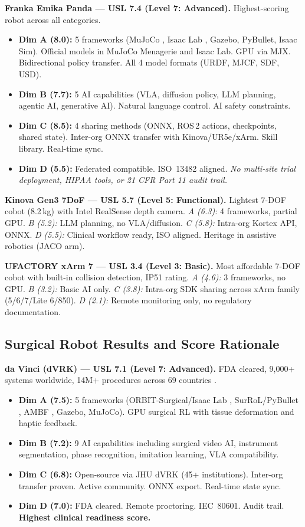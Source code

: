 \documentclass[11pt,a4paper]{article}
\begin{document}
\textbf{Franka Emika Panda --- USL 7.4 (Level 7: Advanced).} Highest-scoring robot across all categories.
\begin{itemize}
  \item \textbf{Dim A (8.0):} 5 frameworks (MuJoCo \cite{mujoco2024}, Isaac Lab \cite{isaaclab2024}, Gazebo, PyBullet, Isaac Sim). Official models in MuJoCo Menagerie \cite{menagerie2024} and Isaac Lab. GPU via MJX. Bidirectional policy transfer. All 4 model formats (URDF, MJCF, SDF, USD).
  \item \textbf{Dim B (7.7):} 5 AI capabilities (VLA, diffusion policy, LLM planning, agentic AI, generative AI). Natural language control. AI safety constraints.
  \item \textbf{Dim C (8.5):} 4 sharing methods (ONNX, ROS\,2 actions, checkpoints, shared state). Inter-org ONNX transfer with Kinova/UR5e/xArm. Skill library. Real-time sync.
  \item \textbf{Dim D (5.5):} Federated compatible. ISO~13482 aligned. \emph{No multi-site trial deployment, HIPAA tools, or 21 CFR Part 11 audit trail.}
\end{itemize}

\textbf{Kinova Gen3 7DoF --- USL 5.7 (Level 5: Functional).} Lightest 7-DOF cobot (8.2\,kg) with Intel RealSense depth camera. \textit{A (6.3):} 4 frameworks, partial GPU. \textit{B (5.2):} LLM planning, no VLA/diffusion. \textit{C (5.8):} Intra-org Kortex API, ONNX. \textit{D (5.5):} Clinical workflow ready, ISO aligned. Heritage in assistive robotics (JACO arm).

\textbf{UFACTORY xArm 7 --- USL 3.4 (Level 3: Basic).} Most affordable 7-DOF cobot with built-in collision detection, IP51 rating. \textit{A (4.6):} 3 frameworks, no GPU. \textit{B (3.2):} Basic AI only. \textit{C (3.8):} Intra-org SDK sharing across xArm family (5/6/7/Lite 6/850). \textit{D (2.1):} Remote monitoring only, no regulatory documentation.

\subsection{Surgical Robot Results and Score Rationale}

\textbf{da Vinci (dVRK) --- USL 7.1 (Level 7: Advanced).} FDA cleared, 9,000+ systems worldwide, 14M+ procedures across 69 countries \cite{dvrk2026}.
\begin{itemize}
  \item \textbf{Dim A (7.5):} 5 frameworks (ORBIT-Surgical/Isaac Lab \cite{orbitsurgical2024}, SurRoL/PyBullet \cite{surrol2024}, AMBF \cite{ambf2024}, Gazebo, MuJoCo). GPU surgical RL with tissue deformation and haptic feedback.
  \item \textbf{Dim B (7.2):} 9 AI capabilities including surgical video AI, instrument segmentation, phase recognition, imitation learning, VLA compatibility.
  \item \textbf{Dim C (6.8):} Open-source via JHU dVRK (45+ institutions). Inter-org transfer proven. Active community. ONNX export. Real-time state sync.
  \item \textbf{Dim D (7.0):} FDA cleared. Remote proctoring. IEC~80601. Audit trail. \textbf{Highest clinical readiness score.}
\end{itemize}
\end{document}
